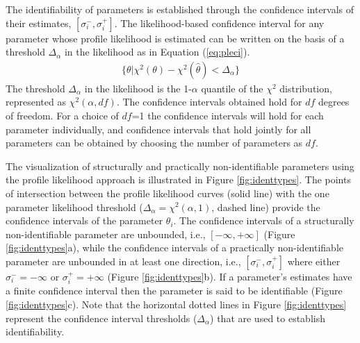 \documentclass[10pt]{article}
\begin{document}
	 The identifiability of parameters is established through the confidence intervals of their estimates, $\left[\sigma_{i}^-,\sigma_{i}^+\right]$. The likelihood-based confidence interval for any parameter whose profile likelihood is estimated can be written on the basis of a threshold $\Delta_{\alpha}$ in the likelihood as in Equation (\ref{eq:pleci}).
	 \begin{align}\label{eq:pleci}
	 \{\theta|\chi^2(\theta)-\chi^2(\hat{\theta})<\Delta_{\alpha}\}
	 \end{align}
	 The threshold $\Delta_{\alpha}$ in the likelihood is the 1-$\alpha$ quantile of the $\chi^2$ distribution, represented as $\chi^2(\alpha,df)$. The confidence intervals obtained hold for $df$ degrees of freedom. For a choice of $df$=1 the confidence intervals will hold for each parameter individually, and confidence intervals that hold jointly for all parameters can be obtained by choosing the number of parameters as $df$. 
	
	The visualization of structurally and practically non-identifiable parameters using the profile likelihood approach is illustrated in Figure \ref{fig:identtypes}. The points of intersection between the profile likelihood curves (solid line) with the one parameter likelihood threshold ($\Delta_{\alpha} = \chi^2(\alpha,1)$, dashed line) provide the confidence intervals of the parameter $\theta_i$. The confidence intervals of a structurally non-identifiable parameter are unbounded, i.e., $\left[-\infty, +\infty\right]$ (Figure \ref{fig:identtypes}a), while the confidence intervals of a practically non-identifiable parameter are unbounded in at least one direction, i.e., $\left[\sigma_{i}^-,\sigma_{i}^+\right]$ where either $\sigma_{i}^- = -\infty$ or $\sigma_{i}^+ = +\infty$ (Figure \ref{fig:identtypes}b). If a parameter's estimates have a finite confidence interval then the parameter is said to be identifiable (Figure \ref{fig:identtypes}c). Note that the horizontal dotted lines in Figure \ref{fig:identtypes} represent the confidence interval thresholds ($\Delta_{\alpha}$) that are used to establish identifiability.
	
\end{document}
